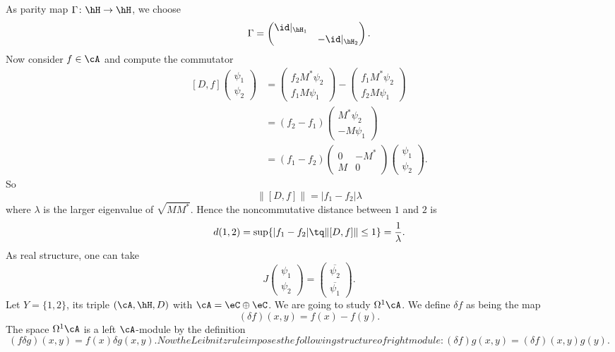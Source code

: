 As parity map $\Gamma\colon \hH\to \hH$, we choose
\[
  \Gamma=\begin{pmatrix}
\id|_{\hH_1}\\ &-\id|_{\hH_2}
\end{pmatrix}.
\]
Now consider $f\in\cA$ and compute the commutator
\[
\begin{split}
  [D,f]\begin{pmatrix}
\psi_1\\\psi_2
\end{pmatrix}
&=
\begin{pmatrix}
f_2 M^*\psi_2\\f_1M\psi_1
\end{pmatrix}
-
\begin{pmatrix}
f_1M^*\psi_2\\f_2M\psi_1
\end{pmatrix}\\
&=(f_2-f_1)\begin{pmatrix}
M^*\psi_2\\-M\psi_1
\end{pmatrix}\\
&=(f_1-f_2)\begin{pmatrix}
0&-M^*\\M&0
\end{pmatrix}
\begin{pmatrix}
\psi_1\\\psi_2
\end{pmatrix}.
\end{split}
\]
So
\[
  \| [D,f] \|=| f_1-f_2 |\lambda
\]
where $\lambda$ is the larger eigenvalue of $\sqrt{MM^*}$. Hence the noncommutative distance between $1$ and $2$ is
\[
  d(1,2)=\sup\{ | f_1-f_2 |\tq \| [D,f] \|\leq 1 \}=\frac{1}{ \lambda }.
\]
As real structure, one can take
\[
  J\begin{pmatrix}
\psi_1\\\psi_2
\end{pmatrix}=
\begin{pmatrix}
\overline{ \psi_2 }\\\overline{ \psi_1 }
\end{pmatrix}.
\]
Let $Y=\{ 1,2 \}$, its triple $(\cA,\hH,D)$ with $\cA=\eC\oplus\eC$. We are going to study $\Omega^1\cA$. We define $\delta f$ as being the map
\begin{equation}
	(\delta f)(x,y)=f(x)-f(y).
\end{equation}
The space $\Omega^1\cA$ is a left $\cA$-module by the definition
\begin{subequations}
\begin{equation}
(f\delta g)(x,y)=f(x)\delta g(x,y).          \label{SubEqfdeltagxya}
\end{equation}
Now the Leibnitz rule imposes the following structure of right module:
\begin{equation}
	(\delta f)g(x,y)=(\delta f)(x,y)g(y).   \label{SubEqfdeltagxyb}
\end{equation}
\end{subequations}
